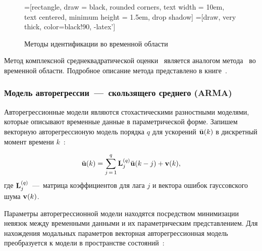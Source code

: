 \begin{figure}[!htb]
	\centering
	=[rectangle, draw = black, rounded corners, text width = 10em, text centered, minimum height = 1.5em, drop shadow]
	=[draw, very thick, color=black!90, -latex']
	\caption{Методы идентификации во временной области~\cite{lib:oma:Nilsson}}\label{fig:schemeTimeDomainOMA}
\end{figure}

Метод комплексной среднеквадратической оценки~ является аналогом метода~ во временной области. Подробное описание метода представлено в книге~\cite{lib:oma:Rainieri}.

\subsubsection{Модель авторегрессии~---~скользящего среднего (ARMA)}

Авторегрессионные модели являются стохастическими разностными моделями, которые описывают временные данные в параметрической форме. Запишем векторную авторегрессионую модель порядка $ q $ для ускорений $ \ddot{\mathbf{u}}(k) $ в дискретный момент времени $ k $~\cite{lib:oma:Chen}:

\begin{equation}
	\ddot{\mathbf{u}}(k) = \sum_{j\,=\,1} ^ q \mathbf{L}_j^{(q)} \ddot{\mathbf{u}}(k - j) + \mathbf{v}(k),
\end{equation}
где $ \mathbf{L}_j^{(q)} $~---~матрица коэффициентов для лага $ j $ и вектора ошибок гауссовского шума $ \mathbf{v}(k) $. 

Параметры авторегрессионной модели находятся посредством минимизации невязок между временными данными и их параметрическим представлением. Для нахождения модальных параметров векторная авторегрессионная модель преобразуется к модели в пространстве состояний~\cite{lib:oma:Pandit}:

